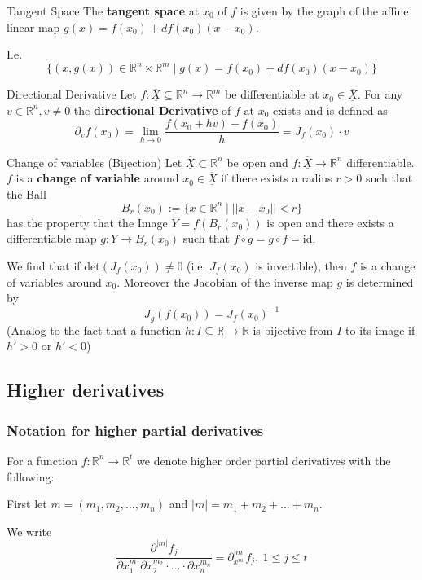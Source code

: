 \documentclass[a4paper,fontsize = 8pt]{scrartcl}
\def\R{\mathbb{R}}
\def\X{\underline{\overline{X}}}
\begin{document}
\begin{subbox}{Tangent Space}
  The \textbf{tangent space} at $x_0$ of \(f\) is given by the graph of the affine linear map \(g(x) = f(x_0) + df(x_0)(x-x_0)\).
  
  I.e. \[\{(x,g(x)) \in \R^n\times\R^m \mid g(x) = f(x_0) + df(x_0)(x-x_0)\}\]
\end{subbox}

\begin{subbox}{Directional Derivative}
    Let $f: \X \subseteq \R^n \to \R^m$ be differentiable at $x_0 \in \X$.
    For any $v \in \R^n, v \neq 0$ the \textbf{directional Derivative} of $f$ at $x_0$ exists and is defined as 
    \[\partial_v f(x_0) = \lim_{h \to 0} \frac{f(x_0 + hv)-f(x_0)}{h} = J_f(x_0) \cdot v\] 
\end{subbox}
\begin{mainbox}{Change of variables (Bijection)}
    Let $\X \subset \R^n$ be open and $f: \X \to \R^n$ differentiable. $f$ is a \textbf{change of variable} around $x_0 \in \X$ if there exists a radius $r > 0$ such that the Ball 
    \[B_r(x_0) := \{x \in \R^n \mid ||x-x_0|| < r\}\] 
    has the property that the Image $Y = f(B_r(x_0))$ is open and there exists a differentiable map $g: Y \to B_r(x_0)$ such that $f \circ g = g \circ f =\text{id}$.

    We find that if det\((J_f(x_0)) \neq 0\) (i.e. $J_f(x_0)$ is invertible), then $f$ is a change of variables around $x_0$. Moreover the Jacobian of the inverse map $g$ is determined by \[J_g(f(x_0)) = J_f(x_0)^{-1}\]
    (Analog to the fact that a function $h: I \subseteq \R \to \R$ is bijective from $I$ to its image if $h' > 0$ or $h' < 0$)
\end{mainbox}
\subsection{Higher derivatives}
\subsubsection*{Notation for higher partial derivatives}
    
For a function $f: \R^n \to \R^t$ we denote higher order partial derivatives with the following:

    First let $m = (m_1, m_2, ..., m_n)$ and $|m| = m_1 + m_2 + ... + m_n$.

    We write
    \[\frac{\partial^{|m|}f_j}{\partial x_1^{m_1} \partial x_2^{m_2} \cdot ... \cdot \partial x_n^{m_n}} = \partial_{x^m}^{|m|}f_j, \ 1 \leq j \leq t\]
\end{document}
